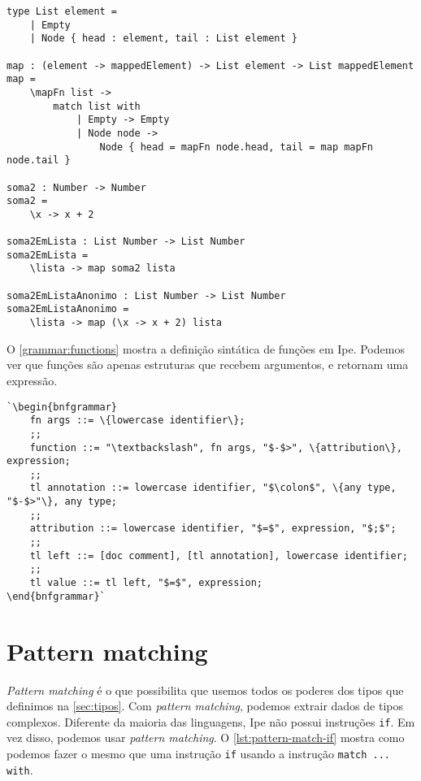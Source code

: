 \begin{lstlisting}[label={lst:chamando-funcoes-higher-order},caption={Exemplo de como passar uma função como argumento}]
type List element =
    | Empty
    | Node { head : element, tail : List element }

map : (element -> mappedElement) -> List element -> List mappedElement
map =
    \mapFn list ->
        match list with
            | Empty -> Empty
            | Node node ->
                Node { head = mapFn node.head, tail = map mapFn node.tail }

soma2 : Number -> Number
soma2 =
    \x -> x + 2

soma2EmLista : List Number -> List Number
soma2EmLista =
    \lista -> map soma2 lista

soma2EmListaAnonimo : List Number -> List Number
soma2EmListaAnonimo =
    \lista -> map (\x -> x + 2) lista
\end{lstlisting}

O \autoref{grammar:functions} mostra a definição sintática de funções em Ipe.
Podemos ver que funções são apenas estruturas que recebem argumentos, e retornam
uma expressão.

\begin{lstlisting}[label={grammar:functions},caption={Definição de funções em EBNF, onde \texttt{tl} significa \textit{top level}},escapechar=`,numbers=none]
`\begin{bnfgrammar}
    fn args ::= \{lowercase identifier\};
    ;;
    function ::= "\textbackslash", fn args, "$-$>", \{attribution\}, expression;
    ;;
    tl annotation ::= lowercase identifier, "$\colon$", \{any type, "$-$>"\}, any type;
    ;;
    attribution ::= lowercase identifier, "$=$", expression, "$;$";
    ;;
    tl left ::= [doc comment], [tl annotation], lowercase identifier;
    ;;
    tl value ::= tl left, "$=$", expression;
\end{bnfgrammar}`
\end{lstlisting}

\section{Pattern matching}\label{sec:pattern-matching}

\textit{Pattern matching} é o que possibilita que usemos todos os poderes dos
tipos que definimos na \autoref{sec:tipos}. Com \textit{pattern matching}, podemos
extrair dados de tipos complexos. Diferente da maioria das linguagens, Ipe não
possui instruções \texttt{if}. Em vez disso, podemos usar \textit{pattern matching}.
O \autoref{lst:pattern-match-if} mostra como podemos fazer o mesmo que uma
instrução \texttt{if} usando a instrução \texttt{match ... with}.


